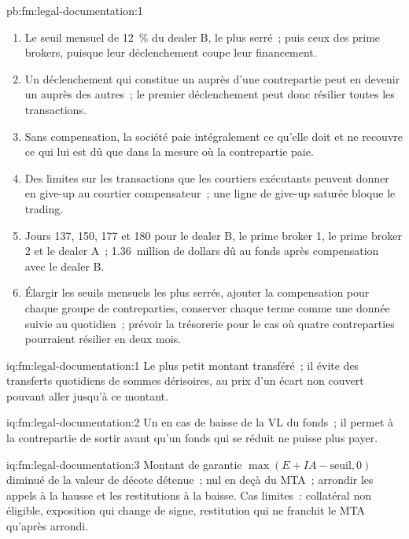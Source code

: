 \begin{solution}{pb:fm:legal-documentation:1}
\begin{enumerate}
\item Le seuil mensuel de 12~\% du dealer B, le plus serré~; puis ceux des prime brokers, puisque leur déclenchement coupe leur financement.
\item Un déclenchement qui constitue un  auprès d'une contrepartie peut en devenir un auprès des autres~; le premier déclenchement peut donc résilier toutes les transactions.
\item Sans compensation, la société paie intégralement ce qu'elle doit et ne recouvre ce qui lui est dû que dans la mesure où la contrepartie paie.
\item Des limites sur les transactions que les courtiers exécutants peuvent donner en give-up au courtier compensateur~; une ligne de give-up saturée bloque le trading.
\item Jours 137, 150, 177 et 180 pour le dealer B, le prime broker 1, le prime broker 2 et le dealer A~; 1.36~million de dollars
dû au fonds après compensation avec le dealer B.
\item Élargir les seuils mensuels les plus serrés, ajouter la compensation pour chaque groupe de contreparties, conserver chaque terme comme une donnée suivie au quotidien~; prévoir la trésorerie
pour le cas où quatre contreparties pourraient résilier en deux mois.
\end{enumerate}
\end{solution}

\begin{solution}{iq:fm:legal-documentation:1}
Le plus petit montant transféré~; il évite des transferts quotidiens de sommes dérisoires, au prix d'un écart non couvert pouvant aller jusqu'à ce montant.
\end{solution}

\begin{solution}{iq:fm:legal-documentation:2}
Un  en cas de baisse de la VL du fonds~; il permet à la contrepartie de sortir avant qu'un fonds qui se réduit ne puisse plus payer.
\end{solution}

\begin{solution}{iq:fm:legal-documentation:3}
Montant de garantie $\max(E+IA-\text{seuil},0)$ diminué de la valeur de décote détenue~; nul en deçà du MTA~; arrondir les appels à la hausse et les restitutions à la baisse. Cas limites~:
collatéral non éligible, exposition qui change de signe, restitution qui ne franchit le MTA qu'après arrondi.
\end{solution}

